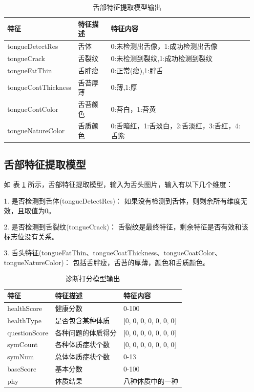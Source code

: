 \begin{table}[]
    \centering
    \begin{tabular}{lll}
        \toprule
        特征 & 特征描述 & 特征内容 \\ 
        \midrule
        tongueDetectRes & 舌体 & 0:未检测出舌像，1:成功检测出舌像 \\
        tongueCrack & 舌裂纹 & 0:未检测到裂纹,1:成功检测到裂纹 \\ 
        tongueFatThin & 舌胖瘦 & 0:正常(瘦),1:胖舌 \\
        tongueCoatThickness & 舌苔厚薄 & 0:薄,1:厚 \\
        tongueCoatColor & 舌苔颜色 & 0:苔白，1:苔黄 \\
        tongueNatureColor & 舌质颜色 & 0:舌暗红，1:舌淡白，2:舌淡红，3:舌红，4:舌紫\\
        \bottomrule
    \end{tabular}

    \caption{舌部特征提取模型输出}
    \label{tab:tongue-feature}
\end{table}

\subsection{舌部特征提取模型}
如 表 \ref{tab:tongue-feature} 所示，舌部特征提取模型，输入为舌头图片，输入有以下几个维度：

1. 是否检测到舌体(tongueDetectRes)： 如果没有检测到舌体，则剩余所有维度无效，且取值为0。

2. 是否检测到舌裂纹(tongueCrack)： 舌裂纹是最终特征，剩余特征是否有效和该标志位没有关系。

3. 舌头特征(tongueFatThin、tongueCoatThickness、tongueCoatColor、tongueNatureColor)： 包括舌胖瘦，舌苔的厚薄，颜色和舌质颜色。

\begin{table}[]
    \begin{center}
        \begin{tabular}{lll}
            \toprule
            特征 & 特征描述 & 特征内容 \\ 
            \midrule
            healthScore & 健康分数 & 0-100 \\
            healthType & 是否包含某种体质 & {[}0, 0, 0, 0, 0, 0, 0{]} \\ 
            questionScore & 各种问题的体质得分 & {[}0, 0, 0, 0, 0, 0, 0{]} \\
            symCount & 各种体质症状个数 & {[}0, 0, 0, 0, 0, 0, 0{]} \\
            symNum & 总体体质症状个数 & 0-13 \\
            baseScore & 基本分数 & 0-100 \\
            phy & 体质结果 & 八种体质中的一种\\
            \bottomrule
        \end{tabular}
    \end{center}
    \caption{诊断打分模型输出}
    \label{tab:diag-feature}
\end{table}

